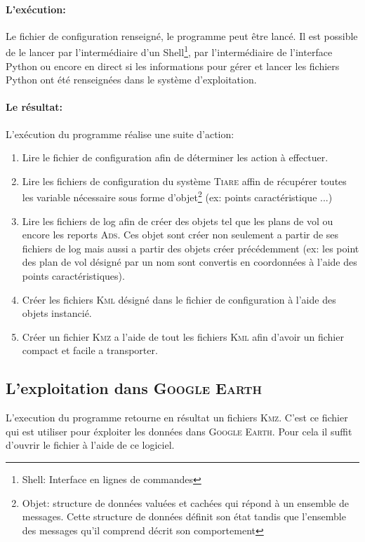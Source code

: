             \paragraph{L'exécution:}
Le fichier de configuration renseigné, le programme peut être lancé. Il est possible de le lancer par l'intermédiaire d'un Shell\footnote{Shell: Interface en lignes de commandes}, par l'intermédiaire de l'interface Python ou encore en direct si les informations pour gérer et lancer les fichiers Python ont été renseignées dans le système d'exploitation.
            \paragraph{Le résultat:}
L'exécution du programme réalise une suite d'action:
\begin{enumerate}
    \item Lire le fichier de configuration afin de déterminer les action à effectuer.
    \item Lire les fichiers de configuration du système \textsc{Tiare} affin de récupérer toutes les variable nécessaire sous forme d'objet\footnote{Objet: structure de données valuées et cachées qui répond à un ensemble de messages. Cette structure de données définit son état tandis que l'ensemble des messages qu'il comprend décrit son comportement} (ex: points caractéristique ...)
    \item Lire les fichiers de log afin de créer des objets tel que les plans de vol ou encore les reports \textsc{Ads}. Ces objet sont créer non seulement a partir de ses fichiers de log mais aussi a partir des objets créer précédemment (ex: les point des plan de vol désigné par un nom sont convertis en coordonnées à l'aide des points caractéristiques).
    \item Créer les fichiers \textsc{Kml} désigné dans le fichier de configuration à l'aide des objets instancié.
    \item Créer un fichier \textsc{Kmz} a l'aide de tout les fichiers \textsc{Kml} afin d'avoir un fichier compact et facile a transporter.
\end{enumerate}

    \subsection{L'exploitation dans \textsc{Google Earth}}
L'execution du programme retourne en résultat un fichiers \textsc{Kmz}. C'est ce fichier qui est utiliser pour éxploiter les données dans \textsc{Google Earth}. Pour cela il suffit d'ouvrir le fichier à l'aide de ce logiciel.

